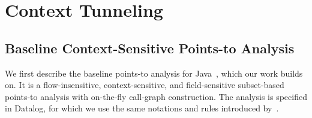 

\commentout
{
\newpage
\section{Context Tunneling} \label{sec:tunneling}

\subsection{Baseline Context-Sensitive Points-to Analysis}

We first describe the baseline points-to analysis
for Java~\cite{Smaragdakis2015}, which our work builds on. 
It is a flow-insensitive, context-sensitive, and
field-sensitive subset-based points-to analysis with on-the-fly
call-graph construction. 
The analysis is specified in Datalog, for which we use the same notations and
rules introduced by~\citet{kastrinis2013hybrid}. 

}
